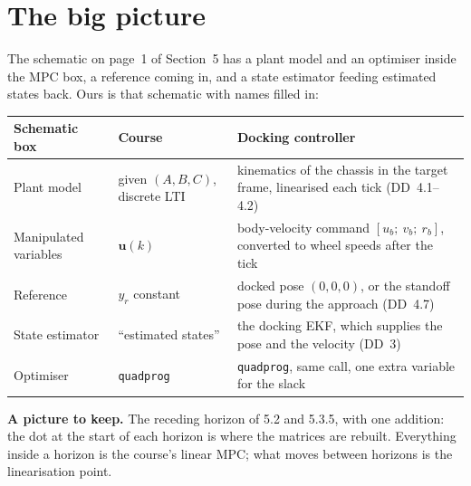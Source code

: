 \documentclass[11pt,a4paper]{article}
\newcommand{\vect}[1]{\bm{#1}}
\newcommand{\du}{\Delta\vect{u}}
\newcommand{\Np}{N_p}
\newcommand{\Nc}{N_c}
\begin{document}
\section{The big picture}
The schematic on page~1 of Section~5 has a plant model and an optimiser inside the MPC box, a reference coming in, and a state estimator feeding estimated states back. Ours is that schematic with names filled in:
\begin{center}
\small
\begin{tabularx}{\linewidth}{l >{\raggedright\arraybackslash}p{4.0cm} X}
\toprule
Schematic box & Course & Docking controller \\
\midrule
Plant model & given $(A, B, C)$, discrete LTI & kinematics of the chassis in the target frame, linearised each tick (DD~4.1--4.2) \\
Manipulated variables & $\vect u(k)$ & body-velocity command $[u_b;\ v_b;\ r_b]$, converted to wheel speeds after the tick \\
Reference & $y_r$ constant & docked pose $(0,0,0)$, or the standoff pose during the approach (DD~4.7) \\
State estimator & ``estimated states'' & the docking EKF, which supplies the pose and the velocity (DD~3) \\
Optimiser & \texttt{quadprog} & \texttt{quadprog}, same call, one extra variable for the slack \\
\bottomrule
\end{tabularx}
\end{center}

\textbf{A picture to keep.} The receding horizon of 5.2 and 5.3.5, with one addition: the dot at the start of each horizon is where the matrices are rebuilt. Everything inside a horizon is the course's linear MPC; what moves between horizons is the linearisation point.
\begin{center}
\end{center}
\end{document}
